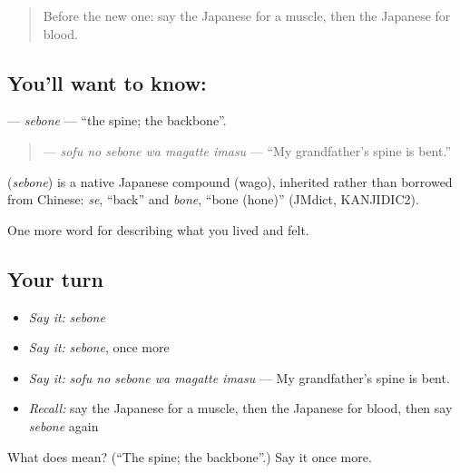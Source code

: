 \begin{quote}
Before the new one: say the Japanese for a muscle, then the Japanese for blood.
\end{quote}

\subsection*{You'll want to know: }
\textbf{} — \emph{sebone} — \textquotedblleft{}the spine; the backbone\textquotedblright{}.

\begin{quote}
\textbf{  } — \emph{sofu no sebone wa magatte imasu} — \textquotedblleft{}My grandfather's spine is bent.\textquotedblright{}
\end{quote}

\begin{cousinweb}
\textbf{} (\emph{sebone}) is a native Japanese compound (wago), inherited rather than borrowed from Chinese: \emph{se}, \textquotedblleft{}back\textquotedblright{} and \emph{bone}, \textquotedblleft{}bone (hone)\textquotedblright{} (JMdict, KANJIDIC2).
\end{cousinweb}

\begin{grammarlens}[title={What you've built}]
One more word for describing what you lived and felt.
\end{grammarlens}

\subsection*{Your turn}
\begin{itemize}
\raggedright
  \item \emph{Say it:} \emph{sebone}
  \item \emph{Say it:} \emph{sebone}, once more
  \item \emph{Say it:} \emph{sofu no sebone wa magatte imasu} — My grandfather's spine is bent.
  \item \emph{Recall:} say the Japanese for a muscle, then the Japanese for blood, then say \emph{sebone} again
\end{itemize}

\begin{tcolorbox}[breakable,colback=teal!4,colframe=teal!35!black,title={Before you move on}]
What does  mean? (\textquotedblleft{}The spine; the backbone\textquotedblright{}.) Say it once more.
\end{tcolorbox}
